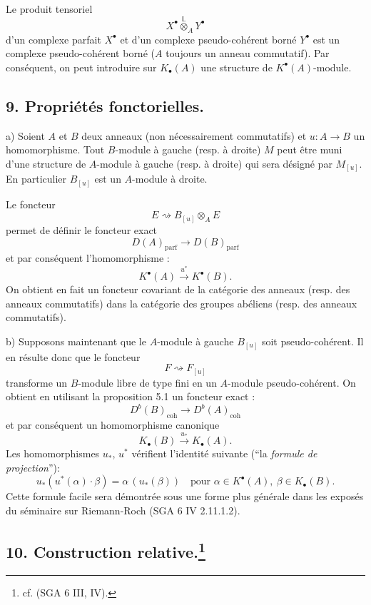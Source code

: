 \documentclass[11pt]{article}
\providecommand{\parf}{\mathrm{parf}}
\providecommand{\coh}{\mathrm{coh}}
\providecommand{\parf}{\mathrm{parf}}
\providecommand{\coh}{\mathrm{coh}}
\begin{document}
Le produit tensoriel
\[
X^\bullet\overset{\mathbb L}{\otimes}_A Y^\bullet
\]
d'un complexe parfait $X^\bullet$ et d'un complexe pseudo-cohérent borné $Y^\bullet$ est un complexe pseudo-cohérent borné ($A$ toujours un anneau commutatif). Par conséquent, on peut introduire sur $K_\bullet(A)$ une structure de $K^{\bullet}(A)$-module.

\subsection*{9. Propriétés fonctorielles.}

a) Soient $A$ et $B$ deux anneaux (non nécessairement commutatifs) et $u:A\to B$ un homomorphisme. Tout $B$-module à gauche (resp. à droite) $M$ peut être muni d'une structure de $A$-module à gauche (resp. à droite) qui sera désigné par $M_{[u]}$. En particulier $B_{[u]}$ est un $A$-module à droite.

Le foncteur
\[
E\rightsquigarrow B_{[u]}\otimes_A E
\]
permet de définir le foncteur exact
\[
D(A)_{\parf}\longrightarrow D(B)_{\parf}
\]
et par conséquent l'homomorphisme :
\[
K^{\bullet}(A)\xrightarrow{u^*}K^{\bullet}(B).
\]
On obtient en fait un foncteur covariant de la catégorie des anneaux (resp. des anneaux commutatifs) dans la catégorie des groupes abéliens (resp. des anneaux commutatifs).

b) Supposons maintenant que le $A$-module à gauche $B_{[u]}$ soit pseudo-cohérent. Il en résulte donc que le foncteur
\[
F\rightsquigarrow F_{[u]}
\]
transforme un $B$-module libre de type fini en un $A$-module pseudo-cohérent. On obtient en utilisant la proposition 5.1 un foncteur exact :
\[
D^b(B)_{\coh}\longrightarrow D^b(A)_{\coh}
\]
et par
conséquent un homomorphisme canonique
\[
K_\bullet(B)\xrightarrow{u_*}K_\bullet(A).
\]
Les homomorphismes $u_*$, $u^*$ vérifient l'identité suivante (``la \emph{formule de projection}''):
\[
u_*(u^*(\alpha)\cdot \beta)=\alpha\,(u_*(\beta))
\quad\text{pour }\alpha\in K^{\bullet}(A),\ \beta\in K_\bullet(B).
\]
Cette formule facile sera démontrée sous une forme plus générale dans les exposés du séminaire sur Riemann-Roch (SGA 6 IV 2.11.1.2).

\subsection*{10. Construction relative.\footnote{cf. (SGA 6 III, IV).}}
\end{document}

